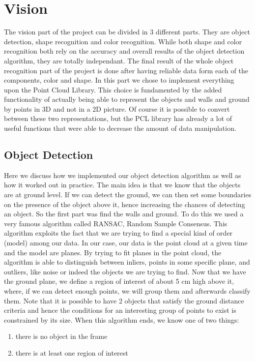 \section{Vision}

The vision part of the project can be divided in 3 different parts.
They are object detection, shape recognition and color recognition.
While both shape and color recognition both rely on the accuracy and overall results of the object detection algorithm, they are totally independant. 
The final result of the whole object recognition part of the project is done after having reliable data form each of the components, color and shape.
In this part we chose to implement everything upon the Point Cloud Library. This choice is fundamented by the added functionality of actually being able to represent the objects and walls and ground by points in 3D and not in a 2D picture. Of course it is possible to convert between these two representations, but the PCL library has already a lot of useful functions that were able to decrease the amount of data manipulation.

\subsection{Object Detection}

Here we discuss how we implemented our object detection algorithm as well as how it worked out in practice.
The main idea is that we know that the objects are at ground level.
If we can detect the ground, we can then set some boundaries on the presence of the object above it, hence increasing the chances of detecting an object.
So the first part was find the walls and ground. To do this we used a very famous algorithm called RANSAC, Random Sample Consensus. This algorithm exploits the fact that we are trying to find a special kind of order (model) among our data.
In our case, our data is the point cloud at a given time and the model are planes. 
By trying to fit planes in the point cloud, the algorithm is able to distinguish between inliers, points in some specific plane, and outliers, like noise or indeed the objects we are trying to find.
Now that we have the ground plane, we define a region of interest of about 5 cm high above it, where, if we can detect enough points, we will group them and afterwards classify them.
Note that it is possible to have 2 objects that satisfy the ground distance criteria and hence the conditions for an interesting group of points to exist is constrained by its size.
When this algorithm ends, we know one of two things:
\begin{enumerate}
\item there is no object in the frame
\item there is at least one region of interest
\end{enumerate}
 
